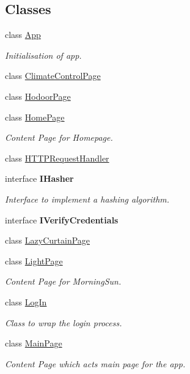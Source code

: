 \subsection*{Classes}
\begin{DoxyCompactItemize}
\item 
class \mbox{\hyperlink{class_f_w_p_s___app_1_1_app}{App}}
\begin{DoxyCompactList}\small\item\em Initialisation of app. \end{DoxyCompactList}\item 
class \mbox{\hyperlink{class_f_w_p_s___app_1_1_climate_control_page}{Climate\+Control\+Page}}
\item 
class \mbox{\hyperlink{class_f_w_p_s___app_1_1_hodoor_page}{Hodoor\+Page}}
\item 
class \mbox{\hyperlink{class_f_w_p_s___app_1_1_home_page}{Home\+Page}}
\begin{DoxyCompactList}\small\item\em Content Page for Homepage. \end{DoxyCompactList}\item 
class \mbox{\hyperlink{class_f_w_p_s___app_1_1_h_t_t_p_request_handler}{H\+T\+T\+P\+Request\+Handler}}
\item 
interface {\bfseries I\+Hasher}
\begin{DoxyCompactList}\small\item\em Interface to implement a hashing algorithm. \end{DoxyCompactList}\item 
interface {\bfseries I\+Verify\+Credentials}
\item 
class \mbox{\hyperlink{class_f_w_p_s___app_1_1_lazy_curtain_page}{Lazy\+Curtain\+Page}}
\item 
class \mbox{\hyperlink{class_f_w_p_s___app_1_1_light_page}{Light\+Page}}
\begin{DoxyCompactList}\small\item\em Content Page for Morning\+Sun. \end{DoxyCompactList}\item 
class \mbox{\hyperlink{class_f_w_p_s___app_1_1_log_in}{Log\+In}}
\begin{DoxyCompactList}\small\item\em Class to wrap the login process. \end{DoxyCompactList}\item 
class \mbox{\hyperlink{class_f_w_p_s___app_1_1_main_page}{Main\+Page}}
\begin{DoxyCompactList}\small\item\em Content Page which acts main page for the app. \end{DoxyCompactList}\item 

\end{DoxyCompactItemize}

